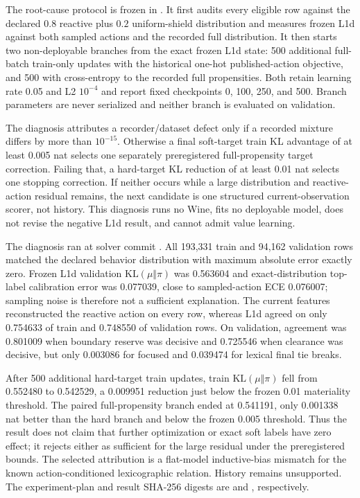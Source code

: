 \documentclass[11pt]{article}
\begin{document}
The root-cause protocol is frozen in
.  It first audits every
eligible row against the declared $0.8$ reactive plus $0.2$ uniform-shield
distribution and measures frozen L1d against both sampled actions and the
recorded full distribution.  It then starts two non-deployable branches from
the exact frozen L1d state: 500 additional full-batch train-only updates with
the historical one-hot published-action objective, and 500 with cross-entropy
to the recorded full propensities.  Both retain learning rate 0.05 and L2
$10^{-4}$ and report fixed checkpoints 0, 100, 250, and 500.  Branch parameters
are never serialized and neither branch is evaluated on validation.

The diagnosis attributes a recorder/dataset defect only if a recorded mixture
differs by more than $10^{-15}$.  Otherwise a final soft-target train KL
advantage of at least 0.005 nat selects one separately preregistered
full-propensity target correction.  Failing that, a hard-target KL reduction of
at least 0.01 nat selects one stopping correction.  If neither occurs while a
large distribution and reactive-action residual remains, the next candidate
is one structured current-observation scorer, not history.  This diagnosis
runs no Wine, fits no deployable model, does not revise the negative L1d result,
and cannot admit value learning.

The diagnosis ran at solver commit
.  All 193,331 train and
94,162 validation rows matched the declared behavior distribution with maximum
absolute error exactly zero.  Frozen L1d validation
$\mathrm{KL}(\mu\Vert\pi)$ was 0.563604 and exact-distribution top-label
calibration error was 0.077039, close to sampled-action ECE 0.076007; sampling
noise is therefore not a sufficient explanation.  The current features
reconstructed the reactive action on every row, whereas L1d agreed on only
0.754633 of train and 0.748550 of validation rows.  On validation, agreement
was 0.801009 when boundary reserve was decisive and 0.725546 when clearance
was decisive, but only 0.003086 for focused and 0.039474 for lexical final tie
breaks.

After 500 additional hard-target train updates, train
$\mathrm{KL}(\mu\Vert\pi)$ fell from 0.552480 to 0.542529, a 0.009951
reduction just below the frozen 0.01 materiality threshold.  The paired
full-propensity branch ended at 0.541191, only 0.001338 nat better than the hard
branch and below the frozen 0.005 threshold.  Thus the result does not claim
that further optimization or exact soft labels have zero effect; it rejects
either as sufficient for the large residual under the preregistered bounds.
The selected attribution is a flat-model inductive-bias mismatch for the known
action-conditioned lexicographic relation.  History remains unsupported.
The experiment-plan and result SHA-256 digests are
and
,
respectively.
\end{document}
